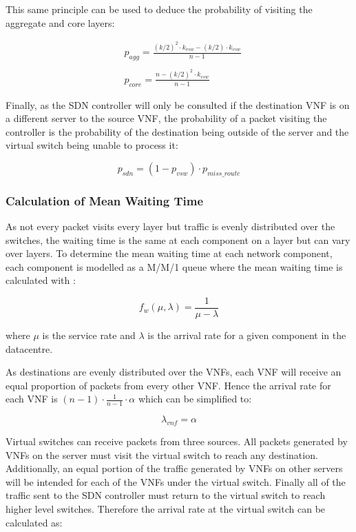 This same principle can be used to deduce the probability of visiting the aggregate and core layers:

\begin{align}
\label{eq:p_agg_core}
&p_{agg} = \frac{(k/2)^2 \cdot k_{vsw} - (k/2) \cdot k_{vsw}}{n - 1} \\ \nonumber \\
&p_{core} = \frac{n - (k/2)^2 \cdot k_{vsw}}{n - 1}
\end{align}

Finally, as the SDN controller will only be consulted if the destination VNF is on a different server to the source VNF, the probability of a packet visiting the controller is the probability of the destination being outside of the server and the virtual switch being unable to process it:

\begin{equation}
\label{eq:p_sdn}
p_{sdn} = (1 - p_{vsw}) \cdot p_{miss\_route}
\end{equation}

\subsubsection{Calculation of Mean Waiting Time}
As not every packet visits every layer but traffic is evenly distributed over the switches, the waiting time is the same at each component on a layer but can vary over layers. To determine the mean waiting time at each network component, each component is modelled as a M/M/1 queue where the mean waiting time is calculated with \cite{Kleinrock75}:

\begin{equation}
\label{eq:MM1_time_in_network}
f_w(\mu, \lambda) = \frac{1}{\mu - \lambda}
\end{equation}

where $\mu$ is the service rate and $\lambda$ is the arrival rate for a given component in the datacentre.

As destinations are evenly distributed over the VNFs, each VNF will receive an equal proportion of packets from every other VNF. Hence the arrival rate for each VNF is $(n - 1) \cdot \frac{1}{n - 1} \cdot \alpha$ which can be simplified to: 

\begin{equation}
\label{eq:arr_vnf}
\lambda_{vnf} = \alpha
\end{equation}

Virtual switches can receive packets from three sources. All packets generated by VNFs on the server must visit the virtual switch to reach any destination. Additionally, an equal portion of the traffic generated by VNFs on other servers will be intended for each of the VNFs under the virtual switch. Finally all of the traffic sent to the SDN controller must return to the virtual switch to reach higher level switches. Therefore the arrival rate at the virtual switch can be calculated as:

